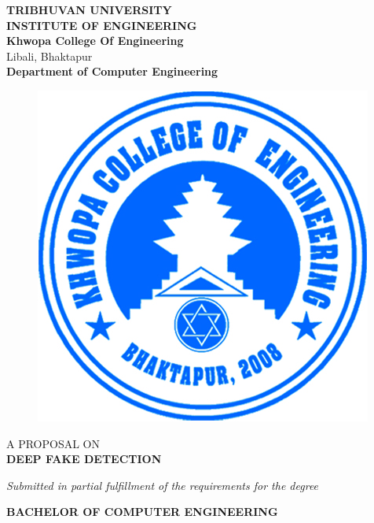     \begin{center}
		\thispagestyle{empty}
		\Large\textbf{TRIBHUVAN UNIVERSITY}\\
		\Large\textbf{INSTITUTE OF ENGINEERING }\\
		\vspace{0.2in}
		\large{\textbf{Khwopa College Of Engineering}\\}
		\normalsize{Libali, Bhaktapur\\}
		\large\textbf{Department of Computer Engineering}
		\vspace{0.2in}
		\begin{figure}[h]
		    \centering
			    \includegraphics{img/Khwopalogo.jpg}
		\end{figure}
		
		\vspace{0.2in}
		\large{A PROPOSAL ON\\\textbf{DEEP FAKE DETECTION}\\}
		
		\vspace{0.2in}
		\large{\textit{Submitted in partial fulfillment of the requirements for the degree\\}}
		
		\vspace{0.2in}
		\large{\textbf{BACHELOR OF COMPUTER ENGINEERING}\\}
		

\end{center}
